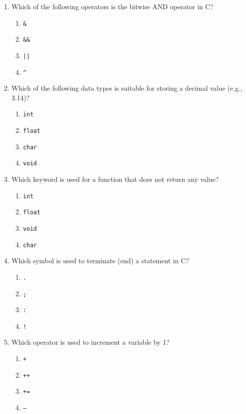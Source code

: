 \documentclass[a4paper,12pt]{article}
\begin{document}
\begin{enumerate}
  \item Which of the following operators is the bitwise AND operator in C?
  \begin{enumerate}[label=(\alph*)]
    \item \texttt{\&}
    \item \texttt{\&\&}
    \item \texttt{||}
    \item \texttt{\^}
  \end{enumerate}

  \item Which of the following data types is suitable for storing a decimal value (e.g., 3.14)?
  \begin{enumerate}[label=(\alph*)]
    \item \texttt{int}
    \item \texttt{float}
    \item \texttt{char}
    \item \texttt{void}
  \end{enumerate}

  \item Which keyword is used for a function that does not return any value?
  \begin{enumerate}[label=(\alph*)]
    \item \texttt{int}
    \item \texttt{float}
    \item \texttt{void}
    \item \texttt{char}
  \end{enumerate}

  \item Which symbol is used to terminate (end) a statement in C?
  \begin{enumerate}[label=(\alph*)]
    \item \texttt{.}
    \item \texttt{;}
    \item \texttt{:}
    \item \texttt{!}
  \end{enumerate}

  \item Which operator is used to increment a variable by 1?
  \begin{enumerate}[label=(\alph*)]
    \item \texttt{+}
    \item \texttt{++}
    \item \texttt{+=}
    \item \texttt{--}
  \end{enumerate}


\end{enumerate}
\end{document}
